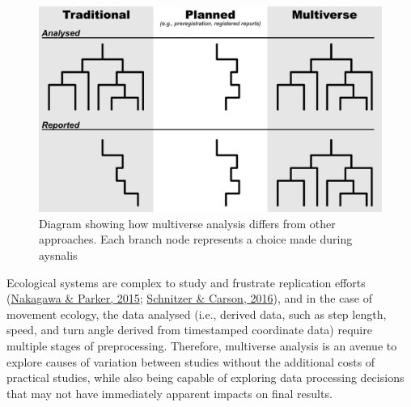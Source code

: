 \documentclass[10pt,a4paper]{article}
\begin{document}
\begin{figure}
\includegraphics[width=1\linewidth]{../ext_images/Multiverse compared diagram} \caption{Diagram showing how multiverse analysis differs from other approaches. Each branch node represents a choice made during aysnalis}\label{fig:multiDiagram}
\end{figure}

Ecological systems are complex to study and frustrate replication efforts (\protect\hyperlink{ref-nakagawa_replicating_2015}{Nakagawa \& Parker, 2015}; \protect\hyperlink{ref-schnitzer_would_2016}{Schnitzer \& Carson, 2016}), and in the case of movement ecology, the data analysed (i.e., derived data, such as step length, speed, and turn angle derived from timestamped coordinate data) require multiple stages of preprocessing.
Therefore, multiverse analysis is an avenue to explore causes of variation between studies without the additional costs of practical studies, while also being capable of exploring data processing decisions that may not have immediately apparent impacts on final results.
\end{document}
